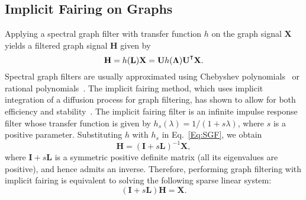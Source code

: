 \documentclass{bmvc2k}
\newcommand{\bg}[1]{\boldsymbol{#1}} \newcommand{\bm}[1]{\mathbf{#1}} \newcommand{\vc}[3]{\overset{#2}{\underset{#3}{#1}}}
\newcommand\T{{\mathpalette\raiseT\intercal}}
\newcommand\raiseT[2]{\setbox0\hbox{$#1{#2}$}\raise\dp0\box0}
\begin{document}
\subsection{Implicit Fairing on Graphs}
Applying a spectral graph filter with transfer function $h$ on the graph signal $\bm{X}$ yields a filtered graph signal $\bm{H}$ given by
\begin{equation}
\bm{H}=h(\bm{L})\bm{X}=\bm{U}h(\bg{\Lambda})\bm{U}^{\T}\bm{X}.
\label{Eq:SGF}
\end{equation}
Spectral graph filters are usually approximated using Chebyshev polynomials~\cite{Taubin:96,Hammond:11,Defferrard:16} or rational polynomials~\cite{Levie:18,Wijesinghe:19}. The implicit fairing method, which uses implicit integration of a diffusion process for graph filtering, has shown to allow for both efficiency and stability~\cite{Desbrun:99}. The implicit fairing filter is an infinite impulse response filter whose transfer function is given by $h_{s}(\lambda)=1/(1+s\lambda)$, where $s$ is a positive parameter. Substituting $h$ with $h_s$ in Eq.~\eqref{Eq:SGF}, we obtain
\begin{equation}
\bm{H}=(\bm{I}+s\bm{L})^{-1}\bm{X},
\end{equation}
where $\bm{I}+s\bm{L}$ is a symmetric positive definite matrix (all its eigenvalues are positive), and hence admits an inverse. Therefore, performing graph filtering with implicit fairing is equivalent to solving the following sparse linear system:
\begin{equation}
(\bm{I}+s\bm{L})\bm{H}=\bm{X}.
\label{Eq:IF}
\end{equation}
\end{document}
